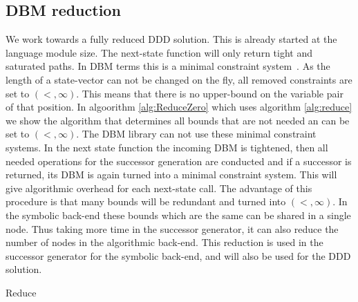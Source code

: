 \subsection{DBM reduction}
We work towards a fully reduced DDD solution. This is already started at the language module size. The next-state function will only return tight and saturated paths. In DBM terms this is a minimal constraint system~\cite{bengtsson2002clocks}. As the length of a state-vector can not be changed on the fly, all removed constraints are set to $(<,\infty)$. This means that there is no upper-bound on the variable pair of that position. In algoorithm \ref{alg:ReduceZero} which uses algorithm \ref{alg:reduce} we show the algorithm that determines all bounds that are not needed an can be set to $(<,\infty)$. 
The DBM library can not use these minimal constraint systems. In the next state function the incoming DBM is tightened, then all needed operations for the successor generation are conducted and if a successor is returned, its DBM is again turned into a minimal constraint system. This will give algorithmic overhead for each next-state call. The advantage of this procedure is that many bounds will be redundant and turned into $(<,\infty)$. In the symbolic back-end these bounds which are the same can be shared in a single node. Thus taking more time in the successor generator, it can also reduce the number of nodes in the algorithmic back-end.
This reduction is used in the successor generator for the symbolic back-end, and will also be used for the DDD solution.

\begin{algorithm}
\caption{Reduce}\label{alg:Reduce}
\begin{algorithmic}[1]
					\EndIf
				\EndIf
			\EndFor
		\EndFor
	\EndFor				
\EndProcedure
\end{algorithmic}
\end{algorithm}

